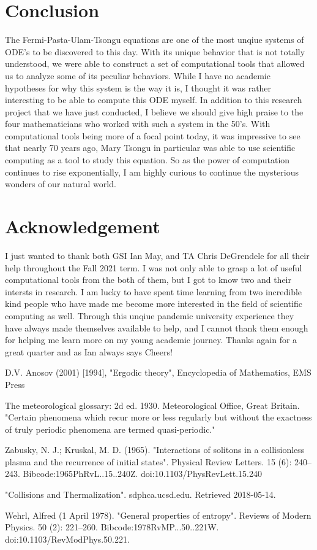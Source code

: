 \section{Conclusion}

The Fermi-Pasta-Ulam-Tsongu equations are one of the most unqiue systems of ODE's to be discovered to this day. With its unique behavior that is not totally understood, we were able to construct a set of computational tools that allowed us to analyze some of its peculiar behaviors. While I have no academic hypotheses for why this system is the way it is, I thought it was rather interesting to be able to compute this ODE myself. In addition to this research project that we have just conducted, I believe we should give high praise to the four mathematicians who worked with such a system in the 50's. With computational tools being more of a focal point today, it was impressive to see that nearly 70 years ago, Mary Tsongu in particular was able to use scientific computing as a tool to study this equation. So as the power of computation continues to rise exponentially, I am highly curious to continue the mysterious wonders of our natural world.

\section{Acknowledgement}

I just wanted to thank both GSI Ian May, and TA Chris DeGrendele for all their help throughout the Fall 2021 term. I was not only able to grasp a lot of useful computational tools from the both of them, but I got to know two and their intersts in research. I am lucky to have spent time learning from two incredible kind people who have made me become more interested in the field of scientific computing as well. Through this unqiue pandemic university experience they have always made themselves available to help, and I cannot thank them enough for helping me learn more on my young academic journey. Thanks again for a great quarter and as Ian always says Cheers!  

\begin{thebibliography}{15}


 D.V. Anosov (2001) [1994], "Ergodic theory", Encyclopedia of Mathematics, EMS Press

 The meteorological glossary: 2d ed. 1930. Meteorological Office, Great Britain. "Certain phenomena which recur more or less regularly but without the exactness of truly periodic phenomena are termed quasi-periodic."

 Zabusky, N. J.; Kruskal, M. D. (1965). "Interactions of solitons in a collisionless plasma and the recurrence of initial states". Physical Review Letters. 15 (6): 240–243. Bibcode:1965PhRvL..15..240Z. doi:10.1103/PhysRevLett.15.240

  "Collisions and Thermalization". sdphca.ucsd.edu. Retrieved 2018-05-14.

  Wehrl, Alfred (1 April 1978). "General properties of entropy". Reviews of Modern Physics. 50 (2): 221–260. Bibcode:1978RvMP...50..221W. doi:10.1103/RevModPhys.50.221.
\end{thebibliography}


